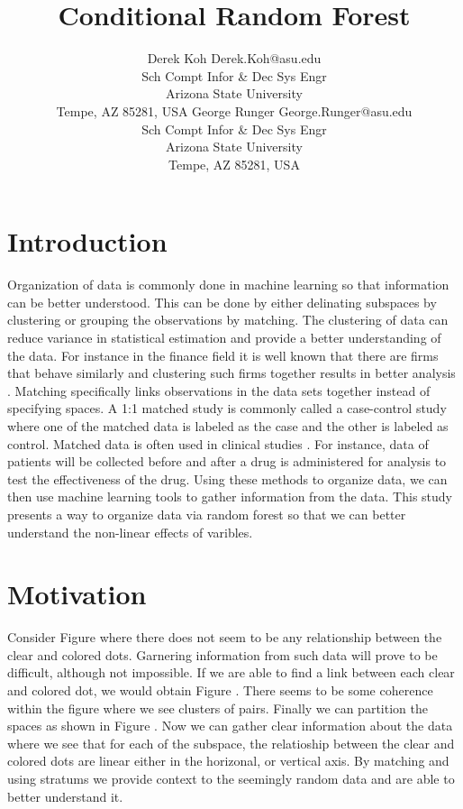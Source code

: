 \documentclass[twoside,11pt]{article}
\title{Conditional Random Forest}
\author{\name Derek Koh \email Derek.Koh@asu.edu \\
       \addr Sch Compt Infor \& Dec Sys Engr\\
       Arizona State University\\
       Tempe, AZ 85281, USA
       \AND
\name George Runger \email George.Runger@asu.edu\\
       \addr Sch Compt Infor \& Dec Sys Engr\\
       Arizona State University\\
       Tempe, AZ 85281, USA
}
\begin{document}
\maketitle

\section{Introduction}
Organization of data is commonly done in machine learning so that information can be better understood. This can be done by either delinating subspaces by clustering or grouping the observations by matching. The clustering of data can reduce variance in statistical estimation and provide a better understanding of the data. For instance in the finance field it is well known that there are firms that behave similarly and clustering such firms together results in better analysis \citep{Daniel97} \citep{Faulkender10}\citep{Bizjak08}\citep{Marsili02}. Matching specifically links observations in the data sets together instead of specifying spaces. A 1:1 matched study is commonly called a case-control study where one of the matched data is labeled as the case and the other is labeled as control. Matched data is often used in clinical studies \citep{Berg10}\citep{Austin08}. For instance, data of patients will be collected before and after a drug is administered for analysis to test the effectiveness of the drug. Using these methods to organize data, we can then use machine learning tools to gather information from the data. This study presents a way to organize data via random forest so that we can better understand the non-linear effects of varibles.

\section{Motivation}
Consider Figure \label{Fig:stratumpic1a} where there does not seem to be any relationship between the clear and colored dots. Garnering information from such data will prove to be difficult, although not impossible. If we are able to find a link between each clear and colored dot, we would obtain Figure \label{Fig:stratumpic1b}. There seems to be some coherence within the figure where we see clusters of pairs. Finally we can partition the spaces as shown in  Figure \label{Fig:stratumpic1c}. Now we can gather clear information about the data where we see that for each of the subspace, the relatioship between the clear and colored dots are linear either in the horizonal, or vertical axis. By matching and using stratums we provide context to the seemingly random data and are able to better understand it.  
\end{document}
